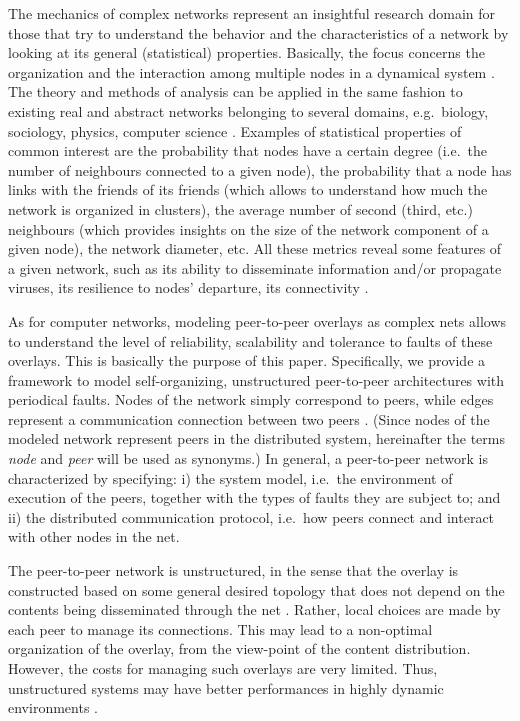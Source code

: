 \documentclass[a4paper,twosided]{article}
\begin{document}
The mechanics of complex networks represent an insightful research domain for those that try to understand the behavior and the characteristics of a network by looking at its general (statistical) properties. Basically, the focus concerns the organization and the interaction among multiple nodes in a dynamical system  \cite{Barabasi2000,Verlag03structuralproperties,Newman03thestructure}. 
The theory and methods of analysis can be applied in the same fashion to 
existing real and abstract networks belonging to several domains, e.g.~biology, sociology, physics, computer science \cite{Nature2001_Amaral,broder,JeoMasBarOlt01,Faloutsos:1999,Price:1965}.
Examples of statistical properties of common interest are the probability that nodes have a certain degree (i.e.~the number of neighbours connected to a given node), the probability that a node has links with the friends of its friends (which allows to understand how much the network is organized in clusters), the average number of second (third, etc.) neighbours (which provides insights on the size of the network component of a given node), the network diameter, etc.
All these metrics reveal some features of a given network, such as its ability to disseminate information and/or propagate viruses, its resilience to nodes' departure, its connectivity \cite{Newman03thestructure,2000Nature_Albert,newmanHandbook,cohen2000res,leonard,wu}. 

As for computer networks, modeling peer-to-peer overlays as complex nets allows to understand the level of reliability, scalability and tolerance to faults of these overlays. This is basically the purpose of this paper. Specifically, we provide a framework to model self-organizing, unstructured peer-to-peer architectures with periodical faults.
Nodes of the network simply correspond to peers, while edges represent a communication connection between two peers \cite{androu,narada,holzer,mobiopp,ioannidis,pompili,ShahabiK05,wang,donet}. (Since nodes of the modeled network represent peers in the distributed system, hereinafter the terms \textit{node} and \textit{peer} will be used as synonyms.) 
In general, a peer-to-peer network is characterized by specifying: i) the system model, i.e.~the environment of execution of the peers, together with the types of faults they are subject to; and ii) the distributed communication protocol, i.e.~how peers connect and interact with other nodes in the net.

The peer-to-peer network is unstructured, in the sense that the overlay is constructed based on some general desired topology that does not depend on the contents being disseminated through the net \cite{EberspacherS05a}. 
Rather, local choices are made by each peer to manage its connections. This may lead to a non-optimal organization of the overlay, from the view-point of the content distribution. However, the costs for managing such overlays are very limited.
Thus, unstructured systems may have better performances in highly dynamic environments \cite{SchmidW07}.
\end{document}
